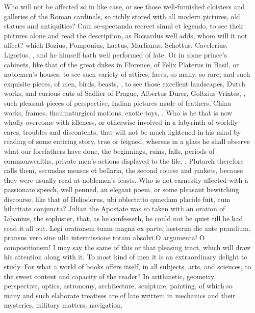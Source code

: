 {Who will not be affected so in like case, or see those well-furnished
cloisters and galleries of the Roman cardinals, so richly stored with
all modern pictures, old statues and antiquities? Cum se-spectando
recreet simul et legendo, to see their pictures alone and read the
description, as Boisardus well adds, whom will it not affect?
which Bozius, Pomponius, Laetus, Marlianus, Schottus, Cavelerius,
Ligorius, \etc{}, and he himself hath well performed of late. Or in some
prince's cabinets, like that of the great dukes in Florence, of Felix
Platerus in Basil, or noblemen's houses, to see such variety of
attires, faces, so many, so rare, and such exquisite pieces, of men,
birds, beasts, \etc{}, to see those excellent landscapes, Dutch works, and
curious cuts of Sadlier of Prague, Albertus Durer, Goltzius Vrintes,
\etc{}, such pleasant pieces of perspective, Indian pictures made of
feathers, China works, frames, thaumaturgical motions, exotic toys, \etc{}.
Who is he that is now wholly overcome with idleness, or otherwise
involved in a labyrinth of worldly cares, troubles and discontents,
that will not be much lightened in his mind by reading of some enticing
story, true or feigned, whereas in a glass he shall observe what our
forefathers have done, the beginnings, ruins, falls, periods of
commonwealths, private men's actions displayed to the life, \etc{}. 
Plutarch therefore calls them, secundas mensas et bellaria, the second
course and junkets, because they were usually read at noblemen's
feasts. Who is not earnestly affected with a passionate speech, well
penned, an elegant poem, or some pleasant bewitching discourse, like
that of  Heliodorus, ubi oblectatio quaedam placide fuit, cum
hilaritate conjuncta? Julian the Apostate was so taken with an oration
of Libanius, the sophister, that, as he confesseth, he could not be
quiet till he had read it all out. Legi orationem tuam magna ex parte,
hesterna die ante prandium, pransus vero sine ulla intermissione totam
absolvi.O argumenta! O compositionem! I may say the same of this
or that pleasing tract, which will draw his attention along with it. To
most kind of men it is an extraordinary delight to study. For what a
world of books offers itself, in all subjects, arts, and sciences, to
the sweet content and capacity of the reader? In arithmetic, geometry,
perspective, optics, astronomy, architecture, sculpture, painting, of
which so many and such elaborate treatises are of late written: in
mechanics and their mysteries, military matters, navigation,
}
